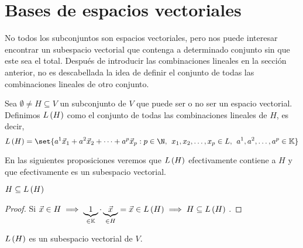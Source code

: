 \documentclass[../algebra_lineal.tex]{subfiles}
\begin{document}
\section{Bases de espacios vectoriales}

No todos los subconjuntos son espacios vectoriales, pero nos puede interesar encontrar un subespacio vectorial que contenga a determinado conjunto sin que este sea el total. Después de introducir las combinaciones lineales en la sección anterior, no es descabellada la idea de definir el conjunto de todas las combinaciones lineales de otro conjunto.

\begin{definition}
    Sea $\emptyset \neq H \subseteq V$ un subconjunto de $V$ que puede ser o no ser un espacio vectorial. Definimos $L\left(H\right)$ como el conjunto de todas las combinaciones lineales de $H$, es decir,
    \[
        \lspan{H} = \set{\lincomb{a}{x}{p} : p \in \N, \spc \dlst{x}{p} \in L, \spc \ulst{a}{p} \in \K}
    \]
\end{definition}

En las siguientes proposiciones veremos que $L\left(H\right)$ efectivamente contiene a $H$ y que efectivamente es un subespacio vectorial.

\begin{proposition}
    $H \subseteq L\left(H\right)$
\end{proposition}

\begin{proof}
    Si $\vec{x} \in H \implies \underbrace{1}_{\in \mathbb{K}} \cdot \underbrace{\vec{x}}_{\in H} = \vec{x} \in L\left(H\right) \implies H \subseteq L\left(H\right)$
    $ $.
\end{proof}

\begin{proposition}
    $L\left(H\right)$ es un subespacio vectorial de $V$.
\end{proposition}
\end{document}
